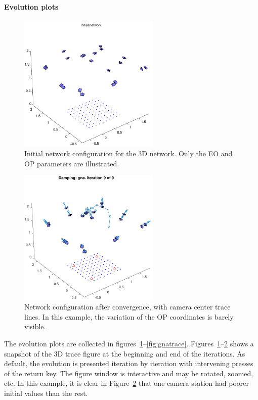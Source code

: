\documentclass{article}
\begin{document}
\paragraph{Evolution plots}
\label{sec:orgd397642}

\begin{figure}[tbp]
\centering
\includegraphics[width=0.6\textwidth]{./ill/ccamx0.pdf}
\caption{\label{fig:camx0}
Initial network configuration for the 3D network. Only the EO and OP parameters are illustrated.}
\end{figure}

\begin{figure}[tbp]
\centering
\includegraphics[width=0.6\textwidth]{./ill/ccamxfinal.pdf}
\caption{\label{fig:camxfinal}
Network configuration after convergence, with camera center trace lines. In this example, the variation of the OP coordinates is barely visible.}
\end{figure}

The evolution plots are collected in
figures~\ref{fig:camx0}--\ref{fig:gnatrace}.
Figures~\ref{fig:camx0}--\ref{fig:camxfinal} shows a snapshot of the 3D trace
figure at the beginning and end of the iterations. As default, the
evolution is presented iteration by iteration with intervening presses
of the return key. The figure window is interactive and may be
rotated, zoomed, etc. In this example, it is clear in
Figure~\ref{fig:camxfinal} that one camera station had poorer initial
values than the rest.
\end{document}
